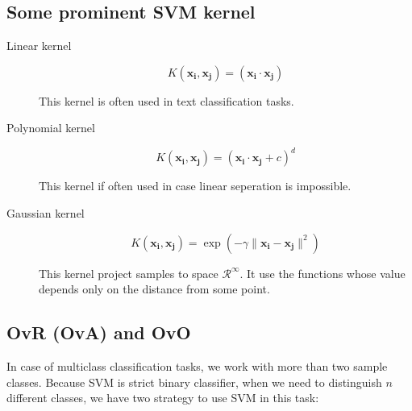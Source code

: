 \subsection*{Some prominent SVM kernel}

\begin{description}

	\item[Linear kernel] 
	
	\begin{equation*}
		K(\bm{x_i}, \bm{x_j}) = (\bm{x_i} \cdot \bm{x_j})
	\end{equation*}
	
	This kernel is often used in text classification tasks.
	
	\item[Polynomial kernel]
	
	\begin{equation*}
		K(\bm{x_i}, \bm{x_j}) = (\bm{x_i} \cdot \bm{x_j} + c)^d
	\end{equation*}
	
	This kernel if often used in case linear seperation is impossible.
	
	\item[Gaussian kernel]
	
	\begin{equation*}
		K(\bm{x_i}, \bm{x_j}) = \exp(-\gamma\parallel\bm{x_i} - \bm{x_j}\parallel^2)
	\end{equation*}
	
	This kernel project samples to space $\mathcal{R}^\infty$. It use the functions whose value depends only on the distance from some point.

\end{description}

\subsection*{OvR (OvA) and OvO}

In case of multiclass classification tasks, we work with more than two sample classes. Because SVM is strict binary classifier, when we need to distinguish $n$ different classes, we have two strategy to use SVM in this task:

